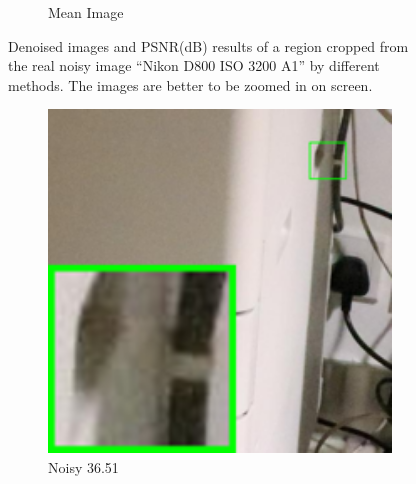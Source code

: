 \begin{figure}
\begin{subfigure}[t]{0.19\textwidth}
\caption{Mean Image}
    \end{subfigure}
    \caption{Denoised images and PSNR(dB) results of a region cropped from the real noisy image ``Nikon D800 ISO 3200 A1'' \cite{crosschannel2016} by different methods. The images are better to be zoomed in on screen.}
    \label{fig3-17}
\end{figure}

\begin{figure}
    \centering
    \begin{subfigure}[t]{0.19\textwidth}
        \centering
        \includegraphics[width=1\textwidth]{images/guided/resize_br_Noisy_Canon_80D_ISO12800_IMG_2321_part2.png}
		\caption{Noisy 36.51}
    \end{subfigure}
    \hfill
    \begin{subfigure}[t]{0.19\textwidth}
        \centering

\end{subfigure}
\end{figure}
